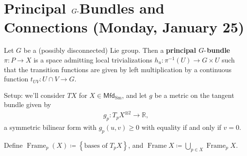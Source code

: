 \hypertarget{principal-ghbox-bundles-and-connections-monday-january-25}{%
\section{\texorpdfstring{Principal \(G{\hbox{-}}\)Bundles and
Connections (Monday, January
25)}{Principal G\{\textbackslash hbox\{-\}\}Bundles and Connections (Monday, January 25)}}\label{principal-ghbox-bundles-and-connections-monday-january-25}}

\begin{definition}

Let \(G\) be a (possibly disconnected) Lie group. Then a
\textbf{principal \(G{\hbox{-}}\)bundle} \(\pi:P\to X\) is a space
admitting local trivializations \(h_u: \pi ^{-1} (U) \to G \times U\)
such that the transition functions are given by left multiplication by a
continuous function \(t_{UV}: U \cap V \to G\).

\begin{figure}
\centering
{}
\end{figure}

\end{definition}

\begin{remark}

Setup: we'll consider \(TX\) for
\(X\in {\mathsf{Mfd}}_{\operatorname{Sm}}\), and let \(g\) be a metric
on the tangent bundle given by
\begin{align*}
g_p: T_pX^{\otimes 2} \to {\mathbb{R}}
,\end{align*}
a symmetric bilinear form with \(g_p(u, v) \geq 0\) with equality if and
only if \(v=0\).

\end{remark}

\begin{definition}

Define
\({\operatorname{Frame}}_p(X) \coloneqq\left\{{\text{bases of } T_p X}\right\}\),
and
\({\operatorname{Frame}}X \coloneqq\bigcup_{p\in X} {\operatorname{Frame}}_p X\).

\end{definition}


